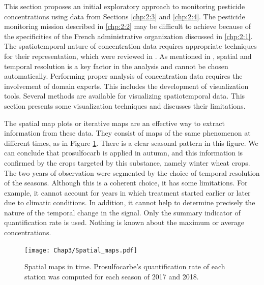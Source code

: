 This section proposes an initial exploratory approach to monitoring pesticide concentrations using data from Sections \ref{chp:2:3} and \ref{chp:2:4}. The pesticide monitoring mission described in \ref{chp:2:2} may be difficult to achieve because of the specificities of the French administrative organization discussed in \ref{chp:2:1}. The spatiotemporal nature of concentration data requires appropriate techniques for their representation, which were reviewed in \cite{Andrienko2003,cressie2015,Maimon2010}. As mentioned in \cite{Ansari2019}, spatial and temporal resolution is a key factor in the analysis and cannot be chosen automatically. Performing proper analysis of concentration data requires the involvement of domain experts. This includes the development of visualization tools. Several methods are available for visualizing spatiotemporal data. This section presents some visualization techniques and discusses their limitations.

The spatial map plots or iterative maps \cite{Andrienko2003} are an effective way to extract information from these data. They consist of maps of the same phenomenon at different times, as in Figure \ref{fig:spa_ex}. There is a clear seasonal pattern in this figure. We can conclude that prosulfocarb is applied in autumn, and this information is confirmed by the crops targeted by this substance, namely winter wheat crops. The two years of observation were segmented by the choice of temporal resolution of the seasons. Although this is a coherent choice, it has some limitations. For example, it cannot account for years in which treatment started earlier or later due to climatic conditions. In addition, it cannot help to determine precisely the nature of the temporal change in the signal. Only the summary indicator of quantification rate is used. Nothing is known about the maximum or average concentrations.
 
\begin{figure}[ht]
    \centering
    \texttt{[image: Chap3/Spatial\_maps.pdf]}
    \caption{Spatial maps in time. Prosulfocarbe's quantification rate of each station was computed for each season of 2017 and 2018.}
    \label{fig:spa_ex}
\end{figure}

